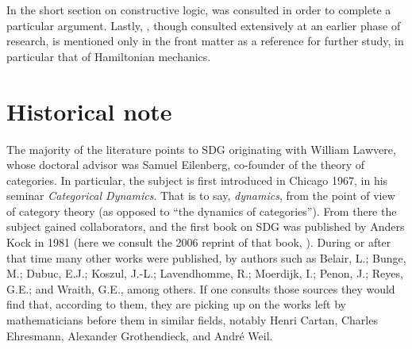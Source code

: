 In the short section on constructive logic, \cite{fra84} was consulted in order to complete a particular argument. Lastly, \cite{nish96}, though consulted extensively at an earlier phase of research, is mentioned only in the front matter as a reference for further study, in particular that of Hamiltonian mechanics. 

\section*{Historical note}

The majority of the literature points to SDG originating with William Lawvere, whose doctoral advisor was Samuel Eilenberg, co-founder of the theory of categories. In particular, the subject is first introduced in Chicago 1967, in his seminar \textit{Categorical Dynamics}. That is to say, \textit{dynamics}, from the point of view of category theory (as opposed to ``the dynamics of categories''). From there the subject gained collaborators, and the first book on SDG was published by Anders Kock in 1981 (here we consult the 2006 reprint of that book, \cite{kock06}). During or after that time many other works were published, by authors such as Belair, L.; Bunge, M.; Dubuc, E.J.; Koszul, J.-L.; Lavendhomme, R.; Moerdijk, I.; Penon, J.; Reyes, G.E.; and Wraith, G.E., among others. If one consults those sources they would find that, according to them, they are picking up on the works left by mathematicians before them in similar fields, notably Henri Cartan, Charles Ehresmann, Alexander Grothendieck, and Andr\'e Weil. 
